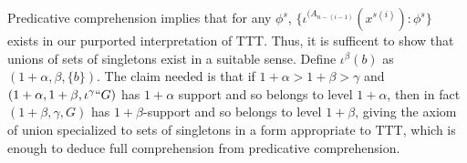\documentclass[12pt]{article}
\begin{document}
\begin{description}
Predicative comprehension implies that for any $\phi^s$, $\{\iota^{(A_{n-(i-1)}}(x^{s(i)}):\phi^s\}$ exists in our purported interpretation of TTT.  Thus, it is sufficent to show that
unions of sets of singletons exist in a suitable sense.  Define $\iota^\beta(b)$ as $(1+\alpha,\beta,\{b\})$.  The claim needed is that if $1+\alpha>1+\beta>\gamma$ and $(1+\alpha,1+\beta,\iota^\gamma``G)$ 
has $1+\alpha$ support and so belongs to level $1+\alpha$, then in fact $(1+\beta,\gamma,G)$ has $1+\beta$-support and so belongs to level $1+\beta$, giving the axiom of union specialized to sets of singletons in a form appropriate to TTT, which is enough to deduce full comprehension from predicative comprehension.







\end{description}
\end{document}

